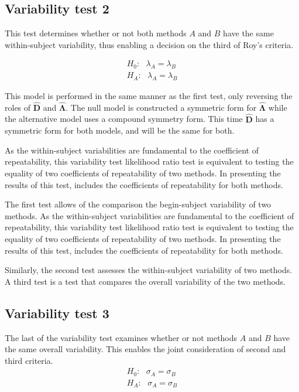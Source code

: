 \documentclass[12pt, a4paper]{report}
\theoremstyle{plain}
\theoremstyle{definition}
\theoremstyle{remark}
\begin{document}
	\subsection{Variability test 2}
	
	This test determines whether or not both methods $A$ and $B$ have the same within-subject variability, thus enabling a decision on the third of Roy's criteria.
	
	\begin{eqnarray*}
		H_{0}: \mbox{ }\lambda_{A}  = \lambda_{B} \\
		H_{A}: \mbox{ }\lambda_{A}  = \lambda_{B}
	\end{eqnarray*}
	
	This model is performed in the same manner as the first test, only reversing the roles of $\boldsymbol{\hat{D}}$ and $\boldsymbol{\hat{\Lambda}}$. The null model is constructed a symmetric form for $\boldsymbol{\hat{\Lambda}}$ while the alternative model uses a compound symmetry form. This time $\boldsymbol{\hat{D}}$ has a symmetric form for both models, and will be the same for both.
	
	As the within-subject variabilities are fundamental to the coefficient of repeatability, this variability test likelihood ratio test is equivalent to testing the equality of two coefficients of repeatability of two methods. In presenting the results of this test, \citet{roy} includes the coefficients of repeatability for both methods.
	
	The first test allows of the comparison the begin-subject variability of two methods. As the within-subject variabilities are fundamental to the coefficient of repeatability, this variability test likelihood ratio test is equivalent to testing the equality of two coefficients of repeatability of two methods. In presenting the results of this test, \citet{roy} includes the coefficients of repeatability for both methods.
	

	
	Similarly, the second test
	assesses the within-subject variability of two methods. A third test is a test that compares the overall variability of the two methods.
	
	
	
	\newpage
	\subsection{Variability test 3}
	The last of the variability test examines whether or not methods $A$ and $B$ have the same overall variability. This enables the joint consideration of second and third criteria.
	\begin{eqnarray*}
		H_{0}: \mbox{ }\sigma_{A}  = \sigma_{B} \\
		H_{A}: \mbox{ }\sigma_{A}  = \sigma_{B}
	\end{eqnarray*}
	
\end{document}
